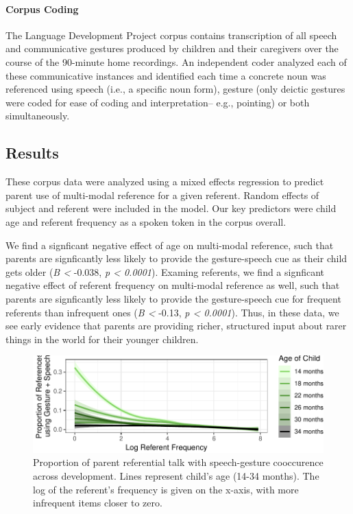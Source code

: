 \documentclass[10pt, letterpaper]{article}
\newenvironment{CodeChunk}{}{}
\begin{document}
\paragraph{Corpus Coding}\label{corpus-coding}

The Language Development Project corpus contains transcription of all
speech and communicative gestures produced by children and their
caregivers over the course of the 90-minute home recordings. An
independent coder analyzed each of these communicative instances and
identified each time a concrete noun was referenced using speech (i.e.,
a specific noun form), gesture (only deictic gestures were coded for
ease of coding and interpretation-- e.g., pointing) or both
simultaneously.

\subsection{Results}\label{results}

These corpus data were analyzed using a mixed effects regression to
predict parent use of multi-modal reference for a given referent. Random
effects of subject and referent were included in the model. Our key
predictors were child age and referent frequency as a spoken token in
the corpus overall.

We find a signficant negative effect of age on multi-modal reference,
such that parents are signficantly less likely to provide the
gesture-speech cue as their child gets older (\emph{B \textless{}}
-0.038, \emph{p \textless{} 0.0001}). Examing referents, we find a
signficant negative effect of referent frequency on multi-modal
reference as well, such that parents are signficantly less likely to
provide the gesture-speech cue for frequent referents than infrequent
ones (\emph{B \textless{}} -0.13, \emph{p \textless{} 0.0001}). Thus, in
these data, we see early evidence that parents are providing richer,
structured input about rarer things in the world for their younger
children.

\begin{CodeChunk}
\begin{figure}[tb]

{\centering \includegraphics{figs/corpus_plot-1} 

}

\caption[Proportion of parent referential talk with speech-gesture cooccurence across development]{Proportion of parent referential talk with speech-gesture cooccurence across development. Lines represent child's age (14-34 months). The log of the referent's frequency is given on the x-axis, with more infrequent items closer to zero.}\label{fig:corpus_plot}
\end{figure}
\end{CodeChunk}
\end{document}
